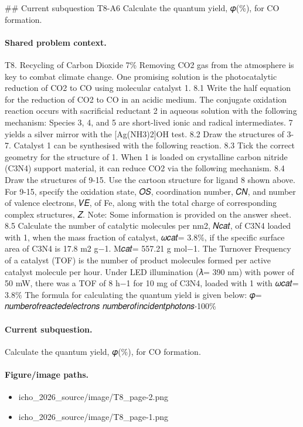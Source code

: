 \#\# Current subquestion T8-A6
Calculate the quantum yield, 𝜑(\%), for CO formation.

\paragraph{Shared problem context.}
T8. Recycling of Carbon Dioxide 7\% Removing CO2 gas from the atmosphere is key to combat climate change. One promising solution is the photocatalytic reduction of CO2 to CO using molecular catalyst 1. 8.1 Write the half equation for the reduction of CO2 to CO in an acidic medium. The conjugate oxidation reaction occurs with sacrificial reductant 2 in aqueous solution with the following mechanism: Species 3, 4, and 5 are short-lived ionic and radical intermediates. 7 yields a silver mirror with the [Ag(NH3)2]OH test. 8.2 Draw the structures of 3-7. Catalyst 1 can be synthesised with the following reaction. 8.3 Tick the correct geometry for the structure of 1. When 1 is loaded on crystalline carbon nitride (C3N4) support material, it can reduce CO2 via the following mechanism. 8.4 Draw the structures of 9-15. Use the cartoon structure for ligand 8 shown above. For 9-15, specify the oxidation state, 𝑂𝑆, coordination number, 𝐶𝑁, and number of valence electrons, 𝑉𝐸, of Fe, along with the total charge of corresponding complex structures, 𝑍. Note: Some information is provided on the answer sheet. 8.5 Calculate the number of catalytic molecules per nm2, 𝑁𝑐𝑎𝑡, of C3N4 loaded with 1, when the mass fraction of catalyst, 𝜔𝑐𝑎𝑡= 3.8\%, if the specific surface area of C3N4 is 17.8 m2 g−1. M𝑐𝑎𝑡= 557.21 g mol−1. The Turnover Frequency of a catalyst (TOF) is the number of product molecules formed per active catalyst molecule per hour. Under LED illumination (𝜆= 390 nm) with power of 50 mW, there was a TOF of 8 h−1 for 10 mg of C3N4, loaded with 1 with 𝜔𝑐𝑎𝑡= 3.8\% The formula for calculating the quantum yield is given below: 𝜑= 𝑛𝑢𝑚𝑏𝑒𝑟𝑜𝑓𝑟𝑒𝑎𝑐𝑡𝑒𝑑𝑒𝑙𝑒𝑐𝑡𝑟𝑜𝑛𝑠 𝑛𝑢𝑚𝑏𝑒𝑟𝑜𝑓𝑖𝑛𝑐𝑖𝑑𝑒𝑛𝑡𝑝ℎ𝑜𝑡𝑜𝑛𝑠⋅100\%

\paragraph{Current subquestion.}
Calculate the quantum yield, 𝜑(\%), for CO formation.

\paragraph{Figure/image paths.}
\begin{itemize}
\item icho\_2026\_source/image/T8\_page-2.png
\item icho\_2026\_source/image/T8\_page-1.png
\end{itemize}


